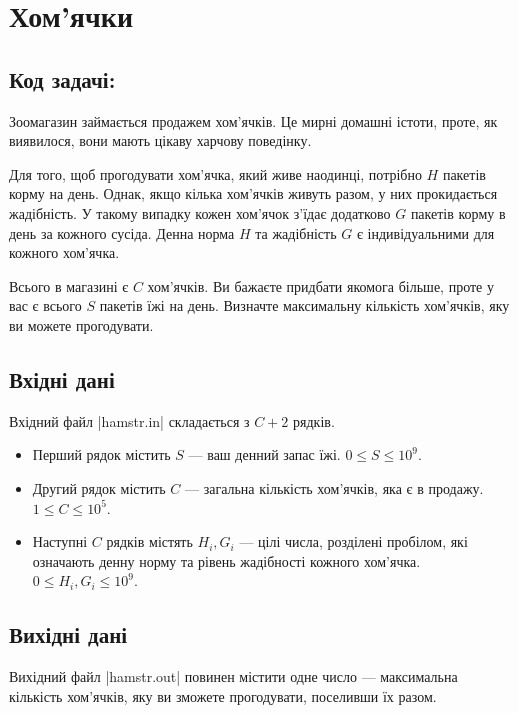 \documentclass[12pt,a4paper]{article}
\begin{document}
\section*{Хом’ячки \hfill {}}


\subsection*{Код задачі: }

Зоомагазин займається продажем хом’ячків. Це мирні домашні істоти, проте, як виявилося, вони мають цікаву харчову поведінку.

Для того, щоб прогодувати хом’ячка, який живе наодинці, потрібно \(H\) пакетів корму на день. Однак, якщо кілька хом’ячків живуть разом, у них прокидається жадібність. У такому випадку кожен хом’ячок з’їдає додатково \(G\) пакетів корму в день за кожного сусіда. Денна норма \(H\) та жадібність \(G\) є індивідуальними для кожного хом’ячка.

Всього в магазині є \(C\) хом’ячків. Ви бажаєте придбати якомога більше, проте у вас є всього \(S\) пакетів їжі на день. Визначте максимальну кількість хом’ячків, яку ви можете прогодувати.


\subsection*{Вхідні дані}

Вхідний файл |hamstr.in| складається з \(C + 2\) рядків.

\begin{itemize}
    \item Перший рядок містить \(S\) --- ваш денний запас їжі. \(0 \leq S \leq 10^9 \).
    \item Другий рядок містить \(C\) --- загальна кількість хом’ячків, яка є в продажу. \(1 \leq C \leq 10^5 \).
    \item Наступні \(C\) рядків містять \(H_i, G_i\) --- цілі числа, розділені пробілом, які означають денну норму та рівень жадібності кожного хом’ячка. \(0 \leq H_i, G_i \leq 10^9 \).
\end{itemize}


\subsection*{Вихідні дані}

Вихідний файл |hamstr.out| повинен містити одне число --- максимальна кількість хом’ячків, яку ви зможете прогодувати, поселивши їх разом.
\end{document}
